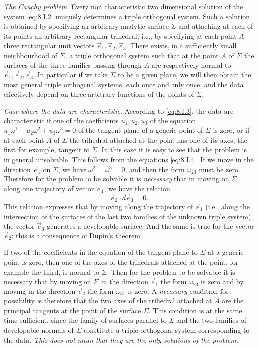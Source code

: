 \documentclass[leqno,11pt]{book}
\numberwithin{equation}{chapter}
\theoremstyle{shape1}
\theoremstyle{shape0}
\theoremstyle{shape2}
\theoremstyle{definition}
\begin{document}
\vspace{12pt}\fsec \emph{The Cauchy problem}. Every non characteristic two dimensional solution of the system \eqref{eq:8.I.2} uniquely determines a triple orthogonal system. Such a solution is obtained by specifying an arbitrary analytic surface $\Sigma$ and attaching at each of its points an arbitrary rectangular trihedral, i.e., by specifying at each point $A$ three rectangular unit vectors $\vec e_{1},\vec e_{2},\vec e_{3}$. There exists, in a sufficiently small neighbourhood of $\Sigma$, a triple orthogonal system such that at the point $A$ of $\Sigma$ the surfaces of the three families passing through $A$ are respectively normal to $\vec e_{1},\vec e_{2},\vec e_{3}$. In particular if we take $\Sigma$ to be a given plane, we will then obtain the most general triple orthogonal systems, each once and only once, and the data effectively depend on three arbitrary functions of the points of $\Sigma$.

\emph{Case where the data are characteristic}. According to \eqref{eq:8.I.3}, the data are characteristic if one of the coefficients $u_{1},u_{2},u_{3}$ of the equation $u_{1}\omega^{1}+u_{2}\omega^{2}+u_{3}\omega^{3}=0$ of the tangent plane of a generic point of $\Sigma$ is zero, or if at each point $A$ of $\Sigma$ the trihedral attached at the point has one of its axes, the first for example, tangent to $\Sigma$. In this case it is easy to see that the problem is in general unsolvable. This follows from the equations \eqref{eq:8.I.4}. If we move in the direction $\vec e_{1}$ on $\Sigma$, we have $\omega^{2}=\omega^{3}=0$, and then the form $\omega_{23}$ must be zero. Therefore for the problem to be solvable it is \emph{necessary} that in moving on $\Sigma$ along one trajectory of vector $\vec e_{1}$, we have the relation
\[
\vec e_{2}\cdot d\vec e_{3}=0.
\]
This relation expresses that by moving along the trajectory of $\vec e_{1}$ (i.e., along the intersection of the surfaces of the last two families of the unknown triple system) the vector $\vec e_{3}$ generates a developable surface. And the same is true for the vector $\vec e_{2}$: this is a consequence of Dupin's theorem.

If two of the coefficients in the equation of the tangent plane to $\Sigma$ at a generic point is zero, then one of the axes of the trihedrals attached at the point, for example the third, is normal to $\Sigma$. Then for the problem to be solvable it is necessary that by moving on $\Sigma$ in the direction $\vec e_{1}$ the form $\omega_{23}$ is zero and by moving in the direction $\vec e_{2}$ the form $\omega_{31}$ is zero. A \emph{necessary} condition for possibility is therefore that the two axes of the trihedral attached at $A$ are the principal tangents at the point of the surface $\Sigma$. This condition is at the same time sufficient, since the family of surfaces parallel to $\Sigma$ and the two families of developable normals of $\Sigma$ constitute a triple orthogonal system corresponding to the data. \emph{This does not mean that they are the only solutions of the problem.}
\end{document}
